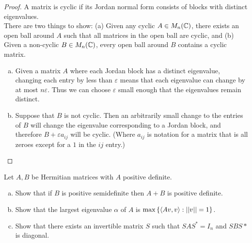 \documentclass{article}
\begin{document}
\begin{proof}
  A matrix is cyclic if its Jordan normal form consists of blocks with distinct
  eigenvalues.
  \\
  There are two things to show: (a) Given any cyclic $A \in M_n(\mathbb C)$, there
  exists an open ball around $A$ such that all matrices in the open ball are
  cyclic, and (b) Given a non-cyclic $B \in M_n(\mathbb C)$, every open ball around
  $B$ contains a cyclic matrix.
  \begin{enumerate}[(a)]
    \item Given a matrix $A$ where each Jordan block has a distinct eigenvalue,
    changing each entry by less than $\varepsilon$ means that each eigenvalue
    can change by at most $n\varepsilon$. Thus we can choose $\varepsilon$ small
    enough that the eigenvalues remain distinct.
    \item Suppose that $B$ is not cyclic. Then an arbitrarily small change to the
    entries of $B$ will change the eigenvalue corresponding to a Jordan block,
    and therefore $B + \varepsilon a_{ij}$ will be cyclic. (Where $a_{ij}$
    is notation for a matrix that is all zeroes except for a $1$ in the $ij$ entry.)
  \end{enumerate}
\end{proof}
\begin{problem}{5} Let $A, B$ be Hermitian matrices with $A$ positive definite.
  \begin{enumerate}[(a)]
    \item Show that if $B$ is positive semidefinite then $A + B$ is positive
    definite.
    \item Show that the largest eigenvalue $\alpha$ of $A$ is
    $\max\left\{ \langle Av, v \rangle : ||v|| = 1 \right\}$.
    \item Show that there exists an invertible matrix $S$ such that
    $SAS^* = I_n$ and $SBS*$ is diagonal.
  \end{enumerate}
\end{problem}
\end{document}
